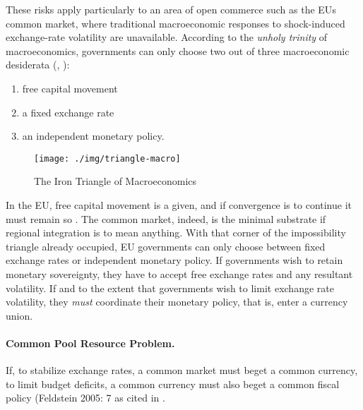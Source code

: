 \documentclass[11pt,a4paper,oneside]{article}
\begin{document}
These risks apply particularly to an area of open commerce such as the \gls{EU}s common market, where traditional macroeconomic responses to shock-induced exchange-rate volatility are unavailable.
According to the \emph{unholy trinity} of macroeconomics, governments can only choose two out of three macroeconomic desiderata (\citealt{Mundell1963}, \citealt{Fleming1962}):
\begin{enumerate}
	\item free capital movement
	\item a fixed exchange rate
	\item an independent monetary policy.
\end{enumerate}

 \begin{figure}[htbp]
	\centering
	\texttt{[image: ./img/triangle-macro]}
	\caption{The Iron Triangle of Macroeconomics}
	\label{fig:triangle-macro}
\end{figure}

In the \gls{EU}, free capital movement is a given, and if convergence is to continue it must remain so \citep{Abiad2007}.
The common market, indeed, is the minimal substrate if regional integration is to mean anything.
With that corner of the impossibility triangle already occupied, \gls{EU} governments can only choose between fixed exchange rates or independent monetary policy.
If governments wish to retain monetary sovereignty, they have to accept free exchange rates and any resultant volatility.
If and to the extent that governments wish to limit exchange rate volatility, they \emph{must} coordinate their monetary policy, that is, enter a currency union.

\paragraph[Fiscal-CPR]{Common Pool Resource Problem.}  \label{sec:fiscal-CPR} If, to stabilize exchange rates, a common market must beget a common currency, to limit budget deficits, a common currency must also beget a common fiscal policy (Feldstein 2005: 7 as cited in \citep[13]{Begg2008}.
\end{document}
